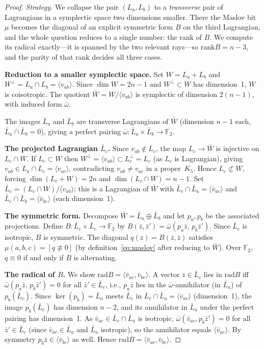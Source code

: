 \documentclass[11pt,a4paper]{article}
\theoremstyle{remark}
\newcommand{\F}{\mathbb{F}}
\newcommand{\rad}{\mathrm{rad}}
\newcommand{\rank}{\mathrm{rank}}
\begin{document}
\begin{proof}
\emph{Strategy.}  We collapse the pair $(L_a,L_b)$ to a \emph{transverse} pair
of Lagrangians in a symplectic space two dimensions smaller.  There the Maslov
bit $\mu$ becomes the diagonal of an explicit symmetric form $B$ on the third
Lagrangian, and the whole question reduces to a single number: the rank of $B$.
We compute its radical exactly---it is spanned by the two relevant rays---so
$\rank B=n-3$, and the parity of that rank decides all three cases.

\medskip
\noindent\textbf{Reduction to a smaller symplectic space.}
Set $W=L_a+L_b$ and $W^\perp=L_a\cap L_b=\langle v_{ab}\rangle$.
Since $\dim W=2n-1$ and $W^\perp\subset W$ has dimension~1, $W$ is coisotropic.
The quotient $\bar W=W/\langle v_{ab}\rangle$ is symplectic of dimension $2(n-1)$,
with induced form $\bar\omega$.

The images $\bar L_a$ and $\bar L_b$ are transverse Lagrangians of $\bar W$
(dimension $n-1$ each, $\bar L_a\cap\bar L_b=0$), giving a perfect pairing
$\bar\omega:\bar L_a\times\bar L_b\to\F_2$.

\medskip
\noindent\textbf{The projected Lagrangian $\bar L_c$.}
Since $v_{ab}\notin L_c$, the map $L_c\to\bar W$ is injective on
$L_c\cap W$.  If $L_c\subset W$ then $W^\perp=\langle v_{ab}\rangle\subset
L_c^\perp=L_c$ (as $L_c$ is Lagrangian), giving $v_{ab}\in L_a\cap L_c=
\langle v_{ac}\rangle$, contradicting $v_{ab}\ne v_{ac}$ in a proper~$K_5$.
Hence $L_c\not\subset W$, forcing $\dim(L_c+W)=2n$ and
$\dim(L_c\cap W)=n-1$.
Set $\bar L_c=(L_c\cap W)/\langle v_{ab}\rangle$; this is a Lagrangian of
$\bar W$ with $\bar L_c\cap\bar L_a=\langle\bar v_{ac}\rangle$ and
$\bar L_c\cap\bar L_b=\langle\bar v_{bc}\rangle$ (each dimension~1).

\medskip
\noindent\textbf{The symmetric form.}
Decompose $\bar W=\bar L_a\oplus\bar L_b$ and let $p_a,p_b$ be the associated
projections.  Define $B:\bar L_c\times\bar L_c\to\F_2$ by
$B(\bar z,\bar z')=\bar\omega(p_a\bar z,\,p_b\bar z')$.
Since $\bar L_c$ is isotropic, $B$ is symmetric.
The diagonal $q(\bar z)=B(\bar z,\bar z)$ satisfies
$\mu(a,b,c)=[q\not\equiv0]$ (by definition~\eqref{eq:maslov} after reducing
to $\bar W$).
Over $\F_2$, $q\equiv0$ if and only if $B$ is alternating.

\medskip
\noindent\textbf{The radical of $B$.}
We show $\rad B=\langle\bar v_{ac},\bar v_{bc}\rangle$.
A vector $\bar z\in\bar L_c$ lies in $\rad B$ iff
$\bar\omega(p_a\bar z,\,p_b\bar z')=0$ for all $\bar z'\in\bar L_c$,
i.e., $p_a\bar z$ lies in the $\bar\omega$-annihilator (in $\bar L_a$) of
$p_b(\bar L_c)$.
Since $\ker(p_b)=\bar L_a$ meets $\bar L_c$ in
$\bar L_c\cap\bar L_a=\langle\bar v_{ac}\rangle$ (dimension~1), the image
$p_b(\bar L_c)$ has dimension $n-2$, and its annihilator in $\bar L_a$
under the perfect pairing has dimension~1.
As $\bar v_{ac}\in\bar L_c\cap\bar L_a$ is isotropic,
$\bar\omega(\bar v_{ac},p_b\bar z')=0$ for all $\bar z'\in\bar L_c$
(since $\bar v_{ac}\in\bar L_a$ and $\bar L_a$ isotropic), so
the annihilator equals $\langle\bar v_{ac}\rangle$.
By symmetry $p_b\bar z\in\langle\bar v_{bc}\rangle$ as well.
Hence $\rad B=\langle\bar v_{ac},\bar v_{bc}\rangle$.


\end{proof}
\end{document}
